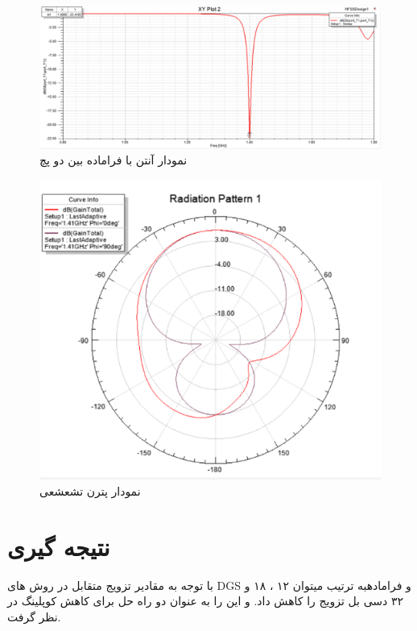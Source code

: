 \begin{figure}
	\centering
	\includegraphics[scale=0.5]{Images/fig44a.jpg}
	\caption{
		 نمودار
		  آنتن با فراماده بین دو پچ
	}
\end{figure}




\begin{figure}
	\centering
	\includegraphics[scale=0.5]{Images/fig45.png}
	\caption{نمودار پترن تشعشعی}
	\label{fig45}
\end{figure}

\section{نتیجه گیری}
با توجه به مقادیر تزویج متقابل در روش های DGS و فرامادهبه ترتیب میتوان ۱۲ ، ۱۸ و ۳۲ دسی بل تزویج را کاهش داد. و این را به عنوان دو راه حل برای کاهش کوپلینگ در نظر گرفت.
